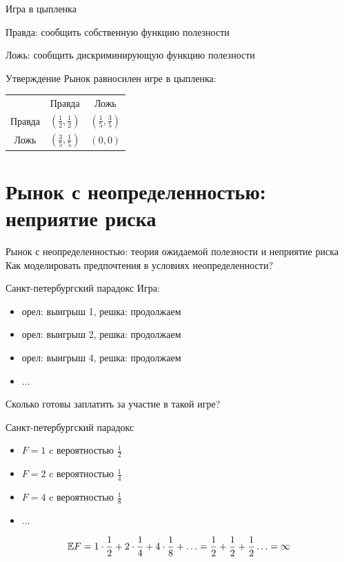 \documentclass{beamer}
\begin{document}
\begin{frame}{Игра в цыпленка}

Правда: сообщить собственную функцию полезности

Ложь: сообщить дискриминирующую функцию полезности

\begin{block}{Утверждение}
Рынок равносилен игре в цыпленка:
\begin{table}
    \centering
    \begin{tabular}{ccc}
         & Правда & Ложь\\
        Правда & $(\frac12,\frac12)$ &  $(\frac15,\frac35)$\\
        Ложь & $(\frac35,\frac15)$  & $(0,0)$ \\
    \end{tabular}
\end{table}

\end{block}
    
\end{frame}




\section{Рынок с неопределенностью: неприятие риска}

\begin{frame}{Рынок с неопределенностью: теория ожидаемой полезности и неприятие риска}
  \centering
\Large Как моделировать предпочтения в условиях неопределенности? 
\end{frame}


\begin{frame}{Санкт-петербургский парадокс}
    Игра:
    \begin{itemize}
        \item орел: выигрыш 1, решка: продолжаем
        \item орел: выигрыш 2, решка: продолжаем
        \item орел: выигрыш 4, решка: продолжаем
        \item ...
    \end{itemize}
    Сколько готовы заплатить за участие в такой игре?
\end{frame}

\begin{frame}{Санкт-петербургский парадокс}
    \begin{itemize}
        \item $F=1$ c вероятностью $\frac12$ 
        \item $F=2$ c вероятностью $\frac14$ 
        \item $F=4$ c вероятностью $\frac18$ 
        \item ...
    \end{itemize}

\pause
    $$
    \mathbb{E} F  = 1 \cdot \frac12 + 2\cdot\frac14 + 4\cdot\frac18 +\ldots = \frac12 + \frac12 + \frac12 \ldots = \infty 
    $$
\end{frame}
\end{document}
